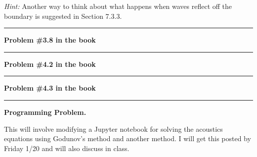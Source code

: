 \documentclass[11pt]{article}
\begin{document}

{\em Hint:} Another way to think about what happens when waves reflect off
the boundary is suggested in Section 7.3.3.







\vskip 1cm
\hrule
{\bf Problem \#3.8 in the book}





\vskip 1cm
\hrule
{\bf Problem \#4.2 in the book}






\vskip 1cm
\hrule
{\bf Problem \#4.3 in the book}






\vskip 1cm
\hrule
{\bf Programming Problem.}

This will involve modifying a Jupyter notebook for solving the acoustics equations using Godunov's method and another method.  I will get this posted by Friday 1/20 and will also discuss in class.


\end{document}
